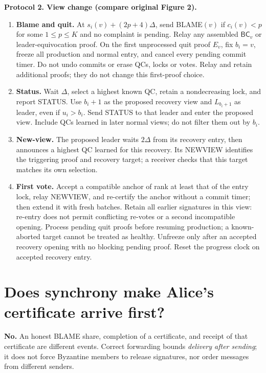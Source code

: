 \documentclass[10pt,a4paper]{article}
\newcommand{\BC}{\mathsf{BC}}
\newcommand{\chg}[1]{\textcolor{red!70!black}{#1}}
\begin{document}
\begin{mdframed}[linewidth=.6pt,innertopmargin=5pt,innerbottommargin=5pt]
\textbf{Protocol 2. View change (compare original Figure 2).}
\begin{enumerate}[label=\textbf{\roman*.},itemsep=3pt]
\item \textbf{Blame and quit.} At $s_i(v)+(2p+4)\Delta$, send BLAME$(v)$
if $c_i(v)<p$ for some $1\le p\le K$ and no complaint is pending.
Relay any assembled $\BC_v$ or leader-equivocation proof.
\chg{On the first unprocessed quit proof $E_v$, fix $b_i=v$, freeze all
production and normal entry, and cancel every pending commit timer.
Do not undo commits or erase QCs, locks or votes. Relay and retain additional
proofs; they do not change this first-proof choice.}
\item \textbf{Status.} Wait $\Delta$, select a highest known QC, retain a
nondecreasing lock, and report STATUS.
\chg{Use $b_i+1$ as the proposed recovery view and $L_{b_i+1}$ as leader,
even if $u_i>b_i$. Send STATUS to that leader and enter the proposed view.
Include QCs learned in later normal views; do not filter them out by $b_i$.}
\item \textbf{New-view.} The proposed leader waits $2\Delta$ from its
recovery entry, then announces a highest QC learned for this recovery.
\chg{Its NEWVIEW identifies the triggering proof and recovery target;
a receiver checks that this target matches its own selection.}
\item \textbf{First vote.} Accept a compatible anchor of rank at least
that of the entry lock, relay NEWVIEW, and re-certify the anchor without a
commit timer; then extend it with fresh batches.
\chg{Retain all earlier signatures in this view: re-entry does not permit
conflicting re-votes or a second incompatible opening. Process pending quit
proofs before resuming production; a known-aborted target cannot be treated
as healthy. Unfreeze only after an accepted recovery opening with no
blocking pending proof. Reset the progress clock on accepted recovery entry.}
\end{enumerate}
\end{mdframed}

\clearpage
\section*{Does synchrony make Alice's certificate arrive first?}
\textbf{No.} An honest BLAME share, completion of a certificate, and receipt
of that certificate are different events. Correct forwarding bounds
\emph{delivery after sending}; it does not force Byzantine members to
release signatures, nor order messages from different senders.
\end{document}
